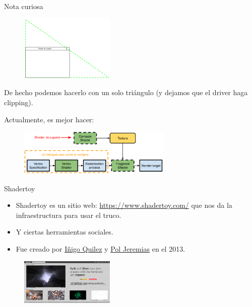 \begin{frame}{Nota curiosa}
\begin{figure}[htp]
  \centering
  \includegraphics[width=0.4\textwidth]{img/onetriangle}
\end{figure}
De hecho podemos hacerlo con un solo triángulo (y dejamos que el driver haga clipping).
\end{frame}

\begin{frame}{Actualmente, es mejor hacer:}
\begin{figure}[htp]
  \centering
  \includegraphics[width=0.65\textwidth]{img/TrucoModerno}
\end{figure}
\end{frame}

\begin{frame}{Shadertoy}
\begin{itemize}
    \item Shadertoy es un sitio web: \url{https://www.shadertoy.com/} que nos da la infraestructura para usar el truco.
    \item Y ciertas herramientas sociales.
    \item Fue creado por \href{https://iquilezles.org/}{Iñigo Quilez} y \href{https://www.poljeremias.com/}{Pol Jeremias} en el 2013.
\end{itemize}
\begin{figure}[htp]
  \centering
  \includegraphics[width=0.4\textwidth]{img/ShaderToySite}
\end{figure}
\end{frame}

